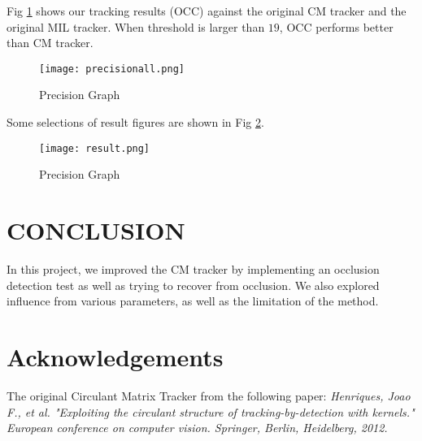 \documentclass[letterpaper, 10 pt, conference]{ieeeconf}
\begin{document}
Fig \ref{preg} shows our tracking results (OCC) against the original CM tracker and the original MIL tracker. When threshold is larger than $19$, OCC performs better than CM tracker.


\begin{figure}[thpb]
\centering
\texttt{[image: precisionall.png]}
\caption{Precision Graph}
\label{preg}
\end{figure}

Some selections of result figures are shown in Fig \ref{result}.


\newpage


\begin{figure}[thpb]
\centering
\texttt{[image: result.png]}
\caption{Precision Graph}
\label{result}
\end{figure}




\section{CONCLUSION}
In this project, we improved the CM tracker by implementing an occlusion detection test as well as trying to recover from occlusion. We also explored influence from various parameters, as well as the limitation of the method.




\section{Acknowledgements}
The original Circulant Matrix Tracker from the following paper: \textit{Henriques, Joao F., et al. "Exploiting the circulant structure of tracking-by-detection with kernels." European conference on computer vision. Springer, Berlin, Heidelberg, 2012.}
\end{document}
